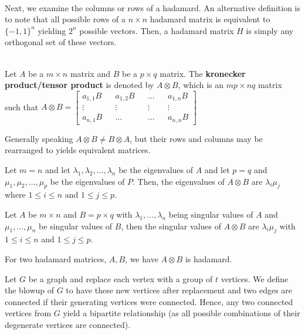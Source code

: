 \\
Next, we examine the columns or rows of a hadamard. An alternative definition is to note that all possible rows of a \(n \times n\) hadamard matrix is equivalent to \(\{-1, 1\} ^{n}\) yielding \(2^{n}\) possible vectors. Then, a hadamard matrix \(H\) is simply any orthogonal set of these vectors.\\
\\
\begin{definition}
	Let \(A\) be a \(m \times n\) matrix and \(B\) be a \(p \times q\) matrix. The \textbf{kronecker product/tensor product} is denoted by \(A \otimes B\), which is an \(mp \times nq\) matrix such that \(A \otimes B = \begin{bmatrix} a_{1, 1}B&& a_{1, 2}B && \ldots && a_{1, n}B\\
		\vdots && \vdots && \vdots && \vdots \\
a_{n, 1}B && \ldots && \ldots && a_{n, n} B\end{bmatrix} \)
\end{definition}
Generally speaking \(A \otimes B \neq B \otimes A\), but their rows and columns may be rearranged to yields equivalent matrices.\\
\begin{theorem}
	Let \(m = n\) and let \(\lambda_1, \lambda_2, \ldots, \lambda_{n}\) be the eigenvalues of \(A\) and let \(p = q\) and \(\mu_1, \mu_2, \ldots, \mu _{p}\) be the eigenvalues of \(P\). Then, the eigenvalues of \(A \otimes B\) are \(\lambda_{i}\mu_{j}\) where \(1\le i \le n\) and \(1 \le j \le p\).
\end{theorem}
\begin{theorem}
	Let \(A\) be \(m \times n\) and \(B = p \times q\) with \(\lambda_1, \ldots, \lambda_{n}\) being singular values of \(A\) and \(\mu_1, \ldots, \mu_{n}\) be singular values of \(B\), then the singular values of \(A \otimes B\) are \(\lambda_{i} \mu_{j}\) with \(1 \le i \le n\) and \(1 \le j \le p\).
\end{theorem}
\begin{proposition}
	For two hadamard matrices, \(A, B\), we have \(A \otimes B\) is hadamard.
\end{proposition}
\begin{definition}
	Let \(G\) be a graph and replace each vertex with a group of \(t\) vertices. We define the blowup of \(G\) to have these new vertices after replacement and two edges are connected if their generating vertices were connected. Hence, any two connected vertices from \(G\) yield a bipartite relationship (as all possible combinations of their degenerate vertices are connected).
	\end{definition}
